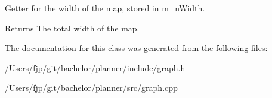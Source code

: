 Getter for the width of the map, stored in m\+\_\+n\+Width. 

\begin{DoxyReturn}{Returns}
The total width of the map. 
\end{DoxyReturn}


The documentation for this class was generated from the following files\+:\begin{DoxyCompactItemize}
\item 
/\+Users/fjp/git/bachelor/planner/include/graph.\+h\item 
/\+Users/fjp/git/bachelor/planner/src/graph.\+cpp\end{DoxyCompactItemize}
